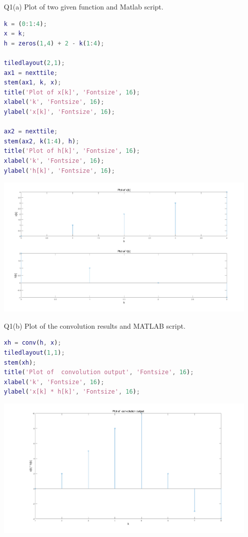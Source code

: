 \documentclass{article}
\begin{document}
\begin{enumerate}
\item[Q1(a)] Plot of two given function and Matlab script.

\begin{lstlisting}[language=Matlab]
k = (0:1:4);
x = k;
h = zeros(1,4) + 2 - k(1:4);

tiledlayout(2,1);
ax1 = nexttile;
stem(ax1, k, x);
title('Plot of x[k]', 'Fontsize', 16);
xlabel('k', 'Fontsize', 16);
ylabel('x[k]', 'Fontsize', 16);

ax2 = nexttile;
stem(ax2, k(1:4), h);
title('Plot of h[k]', 'Fontsize', 16);
xlabel('k', 'Fontsize', 16);
ylabel('h[k]', 'Fontsize', 16);
\end{lstlisting}

\includegraphics[width=\textwidth]{Question1A.png}

\item[Q1(b)] Plot of the convolution results and MATLAB script.

\begin{lstlisting}[language=Matlab]
xh = conv(h, x);
tiledlayout(1,1);
stem(xh);
title('Plot of  convolution output', 'Fontsize', 16);
xlabel('k', 'Fontsize', 16);
ylabel('x[k] * h[k]', 'Fontsize', 16);
\end{lstlisting}

\includegraphics[width=\textwidth]{Question1B.png}


\end{enumerate}
\end{document}
